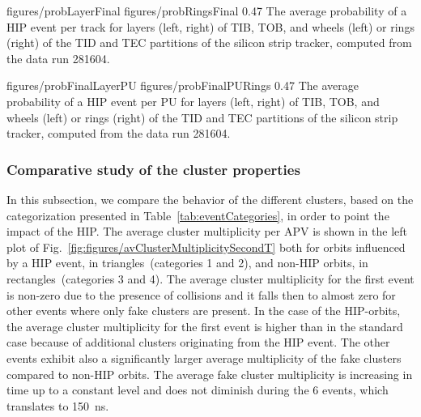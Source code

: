                  {figures/probLayerFinal} %
                 {figures/probRingsFinal} %
                 {0.47}       %
                 {The average probability of a HIP event per track for layers (left, right) of TIB, TOB, and wheels (left) or rings (right) of the TID and TEC partitions of the silicon strip tracker, computed from the data run 281604.} 


                 {figures/probFinalLayerPU} %
                 {figures/probFinalPURings} %
                 {0.47}       %
                 {The average probability of a HIP event per PU for layers (left, right) of TIB, TOB, and wheels (left) or rings (right) of the TID and TEC partitions of the silicon strip tracker, computed from the data run 281604.} 




\subsubsection{Comparative study of the cluster properties~\label{sec:clusterProp}}

In this subsection, we compare the behavior of the different clusters, based on the categorization presented in Table~\ref{tab:eventCategories}, in order to point the impact of the HIP. The average cluster multiplicity per APV is shown in the left plot of Fig.~\ref{fig:figures/avClusterMultiplicitySecondT} both for orbits influenced by a HIP event, in triangles~(categories 1 and 2), and non-HIP orbits, in rectangles~(categories 3 and 4). The average cluster multiplicity for the first event is non-zero due to the presence of collisions and it falls then to almost zero for other events where only fake clusters are present. In the case of the HIP-orbits, the average cluster multiplicity for the first event is higher than in the standard case because of additional clusters originating from the HIP event. The other events exhibit also a significantly larger average multiplicity of the fake clusters compared to non-HIP orbits. The average fake cluster multiplicity is increasing in time up to a constant level and does not diminish during the 6 events, which translates to 150~ns. 

